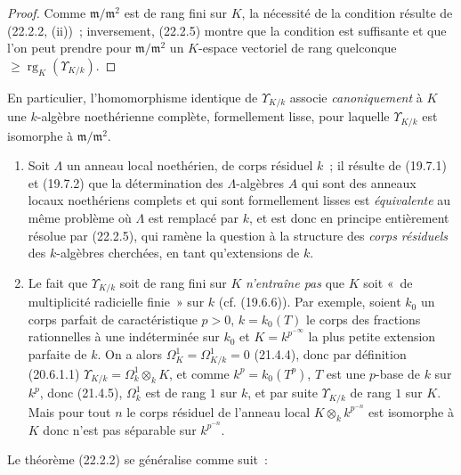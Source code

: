 \begin{proof}
Comme $\mathfrak m/\mathfrak m^2$ est de rang fini sur $K$, la nécessité de
la condition résulte de (22.2.2, (ii))~; inversement, (22.2.5) montre que la
condition est suffisante et que l'on peut prendre pour
$\mathfrak m/\mathfrak m^2$ un $K$-espace vectoriel de rang quelconque
$\geqslant\operatorname{rg}_K(\Upsilon_{K/k})$.
\end{proof}


En particulier, l'homomorphisme identique de $\Upsilon_{K/k}$ associe
\emph{canoniquement} à $K$ une $k$-algèbre noethérienne complète,
formellement lisse, pour laquelle $\Upsilon_{K/k}$ est isomorphe à
$\mathfrak m/\mathfrak m^2$.

\begin{remarks}[22.2.7]
\label{0.22.2.7-fr}
\begin{enumerate}
  \item[(i)] Soit $\Lambda$ un anneau local noethérien, de corps résiduel
  $k$~; il résulte de (19.7.1) et (19.7.2) que la détermination des
  $\Lambda$-algèbres $A$ qui sont des anneaux locaux noethériens complets et
  qui sont formellement lisses est \emph{équivalente} au même problème où
  $\Lambda$ est remplacé par $k$, et est donc en principe entièrement
  résolue par (22.2.5), qui ramène la question à la structure des \emph{corps
  résiduels} des $k$-algèbres cherchées, en tant qu'extensions de $k$.

  \item[(ii)] Le fait que $\Upsilon_{K/k}$ soit de rang fini sur $K$
  \emph{n'entraîne pas} que $K$ soit «~de multiplicité radicielle finie~» sur
  $k$ (cf. (19.6.6)). Par exemple, soient $k_0$ un corps parfait de
  caractéristique $p>0$, $k=k_0(T)$ le corps des fractions rationnelles à une
  indéterminée sur $k_0$ et $K=k^{p^{-\infty}}$ la plus petite extension
  parfaite de $k$. On a alors $\Omega^1_K=\Omega^1_{K/k}=0$ (21.4.4), donc
  par définition (20.6.1.1)
  $\Upsilon_{K/k}=\Omega^1_k\otimes_kK$, et comme $k^p=k_0(T^p)$, $T$ est
  une $p$-base de $k$ sur $k^p$, donc (21.4.5), $\Omega^1_k$ est de rang $1$
  sur $k$, et par suite $\Upsilon_{K/k}$ de rang $1$ sur $K$. Mais pour tout
  $n$ le corps résiduel de l'anneau local $K\otimes_kk^{p^{-n}}$ est
  isomorphe à $K$ donc n'est pas séparable sur $k^{p^{-n}}$.
\end{enumerate}
\end{remarks}

Le théorème (22.2.2) se généralise comme suit~:

